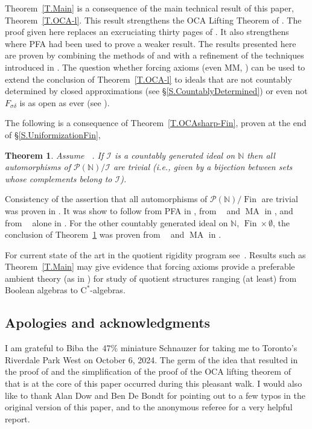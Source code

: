 \documentclass{amsart}
\def\Fin{{\rm Fin}}   %
\def\FinO{\Fin\times\emptyset}
\newtheorem{thm}{Theorem}
\theoremstyle{definition}
\theoremstyle{remark}
\def\Fin{\operatorname{Fin}}
\def\FinO{\Fin\times\emptyset}
\newcommand{\cP}{\mathcal P}
\newcommand{\bbN}{\mathbb N}
\newcommand{\cI}{{\mathcal I}} %
\DeclareMathOperator{\OCAT}{OCA_T}
\newcommand{\cstar}{$\mathrm{C}^*$}
\DeclareMathOperator{\MA}{MA}
\newcommand{\cPN}{\cP(\bbN)}
\numberwithin{claim}{subsection}
\begin{document}
Theorem~\ref{T.Main} is a consequence of the main technical result of this paper, Theorem~\ref{T.OCA-l}. 
This result strengthens the OCA Lifting Theorem of \cite{Fa:AQ}.  The proof given here replaces an excruciating thirty pages of \cite[\S 3.8--\S 3.13]{Fa:AQ}.   It also strengthens \cite{Fa:Luzin} where PFA had been used to prove a weaker result. 
The results presented here are proven by combining the methods of \cite{Fa:AQ} and \cite{Fa:Luzin} with a refinement of the techniques introduced in \cite{de2023trivial}. 
The question whether forcing axioms (even MM, \cite{FoMaShe:Martin}) can be used to extend the conclusion of Theorem~\ref{T.OCA-l} to ideals that are not countably determined by closed approximations (see \S\ref{S.CountablyDetermined}) or even not $F_{\sigma\delta}$ is as open as ever  (see \cite[\S 7.2]{farah2022corona}). 


The following is a consequence of Theorem~\ref{T.OCAsharp-Fin}, proven at the end of \S\ref{S.UniformizationFin}, 

\begin{thm}\label{T.OCAonly}
	Assume $\OCAT$. If $\cI$ is a countably generated ideal on $\bbN$ then all automorphisms of $\cPN/\cI$ are trivial (i.e., given by a bijection between sets whose complements belong to $\cI$). 
\end{thm}

Consistency of the assertion that all automorphisms of $\cPN/\Fin$ are trivial was proven in \cite{Sh:Proper}. It was show to follow from PFA in \cite{ShSte:PFA}, from $\OCAT$ and $\MA$ in \cite{Ve:OCA}, and from $\OCAT$ alone in  \cite[Theorem 1]{de2023trivial}. For the other countably generated ideal on $\bbN$, $\FinO$, the conclusion of Theorem~\ref{T.OCAonly} was proven from $\OCAT$ and $\MA$ in \cite[Theorem 1.9.2]{Fa:AQ}. 



For current state of the art in the quotient rigidity  program see~\cite{farah2022corona}. Results such as Theorem~\ref{T.Main} may give evidence that forcing axioms provide a preferable ambient theory (as in \cite{magidor201some}) for study of quotient structures ranging (at least) from Boolean algebras to \cstar-algebras. 


\subsection*{Apologies and acknowledgments} %
 I am grateful to Biba the~47\% miniature Schnauzer for taking me to Toronto's Riverdale  Park  West on October 6, 2024.  The germ of the idea that resulted in the proof of \cite[Proposition~5.6]{de2023trivial} and the simplification of the proof of the OCA lifting theorem of \cite{Fa:AQ} that is at the core of this paper occurred  during this pleasant walk. 
I would also like to thank Alan Dow and Ben De Bondt for pointing out to a few typos in the original version of this paper, and to the anonymous referee for a very helpful report. 
\end{document}
